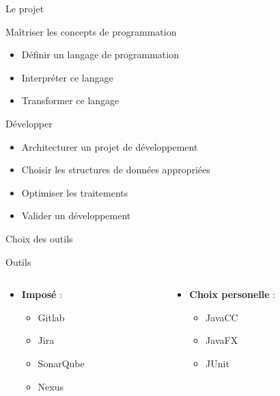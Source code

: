 \begin{frame}{Le projet}
    \begin{block}{Maîtriser les concepts de programmation}
        \begin{itemize}
            \item Définir un langage de programmation
            \item Interpréter ce langage
            \item Transformer ce langage 
        \end{itemize}
    \end{block}
    \begin{block}{Développer}
        \begin{itemize}
            \item Architecturer un projet de développement
            \item Choisir les structures de données appropriées
            \item Optimiser les traitements
            \item Valider un développement
        \end{itemize}
    \end{block}
\end{frame}
    
\begin{frame}{Choix des outils}
    \begin{block}{Outils}
        \begin{columns}
            \begin{column}{0.5\textwidth}
                \begin{itemize}
                    \item \textbf{Imposé} :
                    \begin{itemize}
                        \item Gitlab
                        \item Jira
                        \item SonarQube
                        \item Nexus
                    \end{itemize}
                \end{itemize}
            \end{column}
            \begin{column}{0.5\textwidth}
                \begin{itemize}
                    \item \textbf{Choix personelle} :
                    \begin{itemize}
                        \item JavaCC
                        \item JavaFX
                        \item JUnit
                    \end{itemize}
                \end{itemize}
            \end{column}
        \end{columns}
    \end{block}    
\end{frame}

